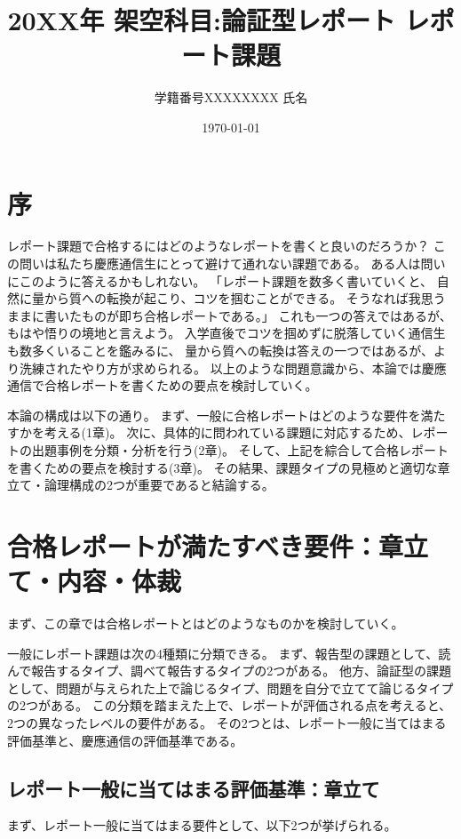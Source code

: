 \documentclass[11pt,a4paper,uplatex]{jsarticle}
\title{20XX年 架空科目:論証型レポート レポート課題}
\author{学籍番号XXXXXXXX 氏名}
\date{\today}
\renewcommand{\footnote}{\endnote} %
\begin{document}
\maketitle


\section*{序}

レポート課題で合格するにはどのようなレポートを書くと良いのだろうか？
この問いは私たち慶應通信生にとって避けて通れない課題である。
ある人は問いにこのように答えるかもしれない。
「レポート課題を数多く書いていくと、
自然に量から質への転換が起こり、コツを掴むことができる。
そうなれば我思うままに書いたものが即ち合格レポートである。」
これも一つの答えではあるが、もはや悟りの境地と言えよう。
入学直後でコツを掴めずに脱落していく通信生も数多くいることを鑑みるに、
量から質への転換は答えの一つではあるが、より洗練されたやり方が求められる。
以上のような問題意識から、本論では慶應通信で合格レポートを書くための要点を検討していく。

本論の構成は以下の通り。
まず、一般に合格レポートはどのような要件を満たすかを考える(1章)。
次に、具体的に問われている課題に対応するため、レポートの出題事例を分類・分析を行う(2章)。
そして、上記を綜合して合格レポートを書くための要点を検討する(3章)。
その結果、課題タイプの見極めと適切な章立て・論理構成の2つが重要であると結論する。

\section{合格レポートが満たすべき要件：章立て・内容・体裁}

まず、この章では合格レポートとはどのようなものかを検討していく。

一般にレポート課題は次の4種類に分類できる\footnote{\citet{totayama2002},
  p.54}。
まず、報告型の課題として、読んで報告するタイプ、調べて報告するタイプの2つがある。
他方、論証型の課題として、問題が与えられた上で論じるタイプ、問題を自分で立てて論じるタイプの2つがある。
この分類を踏まえた上で、レポートが評価される点を考えると、2つの異なったレベルの要件がある。
その2つとは、レポート一般に当てはまる評価基準と、慶應通信の評価基準である。

\subsection{レポート一般に当てはまる評価基準：章立て}

まず、レポート一般に当てはまる要件として、以下2つが挙げられる\footnote{\citet{kawano2018},
  p.32-42}。
\end{document}
